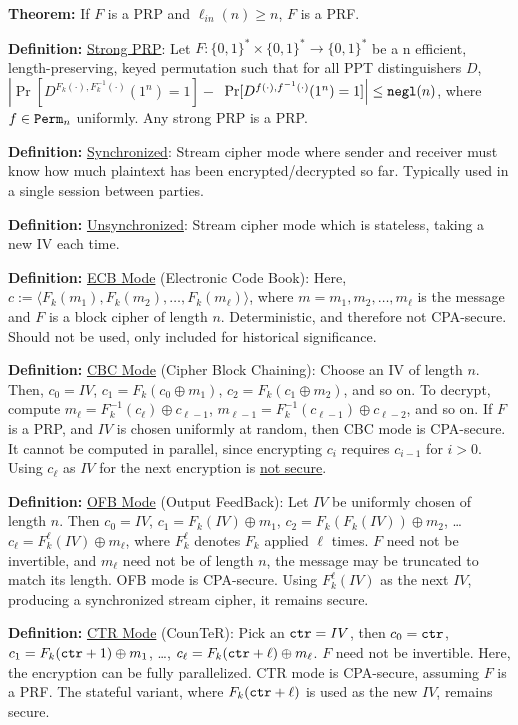 \documentclass[12pt]{article}
\newcommand{\defn}[1]{{\bf Definition:} \underline{#1}}
\newcommand{\thm}[1]{{\bf Theorem:} \underline{#1}}
\newcommand{\ang}[1]{\langle#1\rangle}
\newcommand{\xor}{\oplus}
\newcommand{\negl}{{\tt negl}}
\newcommand{\ctr}{{\tt ctr}}
\begin{document}
\begin{multicols}{3}
\thm{} If $F$ is a PRP and $\ell_{in}(n)\geq n$, $F$ is a PRF.

\defn{Strong PRP}: Let $F:\{0,1\}^*\times\{0,1\}^*\to\{0,1\}^*$ be a n efficient, length-preserving, keyed permutation such that for all PPT distinguishers $D$, $\left|\Pr[D^{F_k(\cdot),F_k^{-1}(\cdot)}(1^n)=1]-\right.$ $\left.\Pr[D^{f(\cdot),f^{-1}(\cdot)}(1^n)=1]\right|\leq\negl(n)$, where $f\in{\tt Perm}_n$ uniformly. Any strong PRP is a PRP.

\defn{Synchronized}: Stream cipher mode where sender and receiver must know how much plaintext has been encrypted/decrypted so far. Typically used in a single session between parties.

\defn{Unsynchronized}: Stream cipher mode which is stateless, taking a new IV each time.

\defn{ECB Mode} (Electronic Code Book): Here, $c:=\ang{F_k(m_1),F_k(m_2),\dots,F_k(m_\ell)}$, where $m=m_1,m_2,\dots,m_\ell$ is the message and $F$ is a block cipher of length $n$. Deterministic, and therefore not CPA-secure. Should not be used, only included for historical significance.

\defn{CBC Mode} (Cipher Block Chaining): Choose an IV of length $n$. Then, $c_0=IV$, $c_1=F_k(c_0\xor m_1)$, $c_2=F_k(c_1\xor m_2)$, and so on. To decrypt, compute $m_\ell=F^{-1}_k(c_\ell)\xor c_{\ell-1}$, $m_{\ell-1}=F_k^{-1}(c_{\ell-1})\xor c_{\ell-2}$, and so on. If $F$ is a PRP, and $IV$ is chosen uniformly at random, then CBC mode is CPA-secure. It cannot be computed in parallel, since encrypting $c_i$ requires $c_{i-1}$ for $i>0$. Using $c_\ell$ as $IV$ for the next encryption is \underline{not secure}.

\defn{OFB Mode} (Output FeedBack): Let $IV$ be uniformly chosen of length $n$. Then $c_0=IV$, $c_1=F_k(IV)\xor m_1$, $c_2=F_k(F_k(IV))\xor m_2$, \dots $c_\ell=F_k^\ell(IV)\xor m_\ell$, where $F_k^\ell$ denotes $F_k$ applied $\ell$ times. $F$ need not be invertible, and $m_\ell$ need not be of length $n$, the message may be truncated to match its length. OFB mode is CPA-secure. Using $F_k^{\ell}(IV)$ as the next $IV$, producing a synchronized stream cipher, it remains secure.

\defn{CTR Mode} (CounTeR): Pick an $\ctr=IV$, then $c_0=\ctr$, $c_1=F_k(\ctr+1)\xor m_1$, \dots, $c_\ell=F_k(\ctr+\ell)\xor m_\ell$. $F$ need not be invertible. Here, the encryption can be fully parallelized. CTR mode is CPA-secure, assuming $F$ is a PRF. The stateful variant, where $F_k(\ctr+\ell)$ is used as the new $IV$, remains secure.


\end{multicols}
\end{document}
